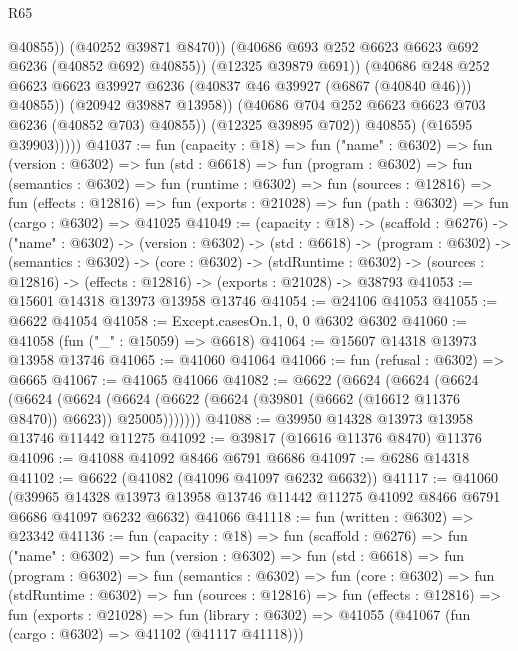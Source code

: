 \begin{lexlean}{R65}
\begin{coremodule}
{                                @40855))
                            (@40252 @39871 @8470))
                          (@40686 @693 @252 @6623 @6623 @692 @6236 (@40852 @692) @40855))
                        (@12325 @39879 @691))
                      (@40686
                        @248
                        @252
                        @6623
                        @6623
                        @39927
                        @6236
                        (@40837 @46 @39927 (@6867 (@40840 @46)))
                        @40855))
                    (@20942 @39887 @13958))
                  (@40686 @704 @252 @6623 @6623 @703 @6236 (@40852 @703) @40855))
                (@12325 @39895 @702))
              @40855)
            (@16595 @39903)))))
@41037 := fun (capacity : @18) =>
  fun ("name" : @6302) =>
  fun (version : @6302) =>
  fun (std : @6618) =>
  fun (program : @6302) =>
  fun (semantics : @6302) =>
  fun (runtime : @6302) =>
  fun (sources : @12816) =>
  fun (effects : @12816) =>
  fun (exports : @21028) => fun (path : @6302) => fun (cargo : @6302) => @41025
@41049 := (capacity : @18) ->
  (scaffold : @6276) ->
  ("name" : @6302) ->
  (version : @6302) ->
  (std : @6618) ->
  (program : @6302) ->
  (semantics : @6302) ->
  (core : @6302) ->
  (stdRuntime : @6302) -> (sources : @12816) -> (effects : @12816) -> (exports : @21028) -> @38793
@41053 := @15601 @14318 @13973 @13958 @13746
@41054 := @24106 @41053
@41055 := @6622 @41054
@41058 := Except.casesOn.{1, 0, 0} @6302 @6302
@41060 := @41058 (fun ("_" : @15059) => @6618)
@41064 := @15607 @14318 @13973 @13958 @13746
@41065 := @41060 @41064
@41066 := fun (refusal : @6302) => @6665
@41067 := @41065 @41066
@41082 := @6622
    (@6624
      (@6624
        (@6624
          (@6624
            (@6624 (@6624 (@6622 (@6624 (@39801 (@6662 (@16612 @11376 @8470)) @6623)) @25005)))))))
@41088 := @39950 @14328 @13973 @13958 @13746 @11442 @11275
@41092 := @39817 (@16616 @11376 @8470) @11376
@41096 := @41088 @41092 @8466 @6791 @6686
@41097 := @6286 @14318
@41102 := @6622 (@41082 (@41096 @41097 @6232 @6632))
@41117 := @41060
    (@39965 @14328 @13973 @13958 @13746 @11442 @11275 @41092 @8466 @6791 @6686 @41097 @6232 @6632)
    @41066
@41118 := fun (written : @6302) => @23342
@41136 := fun (capacity : @18) =>
  fun (scaffold : @6276) =>
  fun ("name" : @6302) =>
  fun (version : @6302) =>
  fun (std : @6618) =>
  fun (program : @6302) =>
  fun (semantics : @6302) =>
  fun (core : @6302) =>
  fun (stdRuntime : @6302) =>
  fun (sources : @12816) =>
  fun (effects : @12816) =>
  fun (exports : @21028) =>
  fun (library : @6302) => @41055 (@41067 (fun (cargo : @6302) => @41102 (@41117 @41118)))
}
\end{coremodule}
\end{lexlean}
